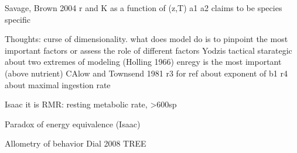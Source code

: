  Savage, Brown 2004 r and K as a function of (z,T)
 a1 a2 claims to be species specific
 
 
 
 Thoughts: curse of dimensionality. what does model do is to pinpoint the most important factors or assess the role of different factors
 Yodzis
 tactical starategic about two extremes of modeling (Holling 1966)
enregy is the most important (above nutrient) CAlow and Townsend 1981
r3 for ref about exponent of b1
r4 about maximal ingestion rate

Isaac it is RMR: resting metabolic rate, >600sp

Paradox of energy equivalence  (Isaac)

Allometry of behavior Dial 2008 TREE